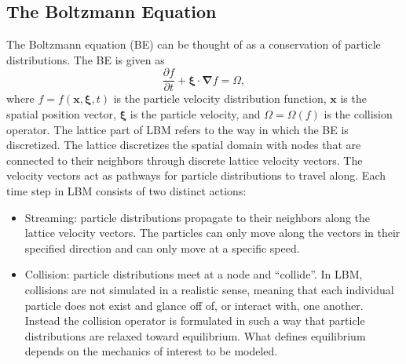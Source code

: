 \documentclass[pdftex,ms]{pittetd}
\newcommand{\pos}{\mathbf{x}}
\newcommand{\pvel}{\boldsymbol{\xi}}
\newcommand{\colop}{\Omega}
\newcommand{\grad}{\boldsymbol{\nabla}}
\begin{document}
\subsection{The Boltzmann Equation}
The Boltzmann equation (BE) can be thought of as a conservation of particle distributions.
The BE is given as 
\begin{equation}
\frac{\partial f}{\partial t} + \pvel \cdot \grad f = \colop,
\end{equation}
\noindent where $f = f(\pos, \pvel, t)$ is the particle velocity distribution function, $\pos$ is the spatial position vector, $\pvel$ is the particle velocity, and $\colop = \colop(f)$ is the collision operator.
The lattice part of LBM refers to the way in which the BE is discretized.
The lattice discretizes the spatial domain with nodes that are connected to their neighbors through discrete lattice velocity vectors.
The velocity vectors act as pathways for particle distributions to travel along.
Each time step in LBM consists of two distinct actions:

\begin{itemize}
\item Streaming: particle distributions propagate to their neighbors along the lattice velocity vectors.
The particles can only move along the vectors in their specified direction and can only move at a specific speed.
\item Collision: particle distributions meet at a node and ``collide''.
In LBM, collisions are not simulated in a realistic sense, meaning that each individual particle does not exist and glance off of, or interact with, one another.
Instead the collision operator is formulated in such a way that particle distributions are relaxed toward equilibrium.
What defines equilibrium depends on the mechanics of interest to be modeled.
\end{itemize}
\end{document}
